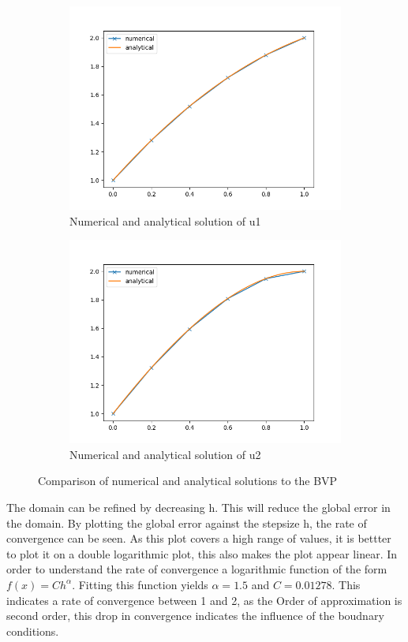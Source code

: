\documentclass{article}
\begin{document}
\begin{figure}[H]
    \begin{subfigure}{.5\textwidth}
      \centering
      \includegraphics[width=.9\linewidth]{u1sym.png}
      \caption{Numerical and analytical solution of u1}
    \end{subfigure}%
    \begin{subfigure}{.5\textwidth}
      \centering
      \includegraphics[width=.9\linewidth]{u2sym.png}
      \caption{Numerical and analytical solution of u2}
    \end{subfigure}
    \caption{Comparison of numerical and analytical solutions to the BVP}
\end{figure}
The domain can be refined by decreasing h. This will reduce the global error in the domain. By plotting the global error against the stepsize h, the rate of convergence can be seen. As this plot covers a high range of values, it is bettter to plot it on a double logarithmic plot, this also makes the plot appear linear. In order to understand the rate of convergence a logarithmic function of the form $f(x) = Ch^{\alpha}$. Fitting this function yields $\alpha=1.5$ and $C = 0.01278$. This indicates a rate of convergence between 1 and 2, as the Order of approximation is second order, this drop in convergence indicates the influence of the boudnary conditions.
\end{document}
